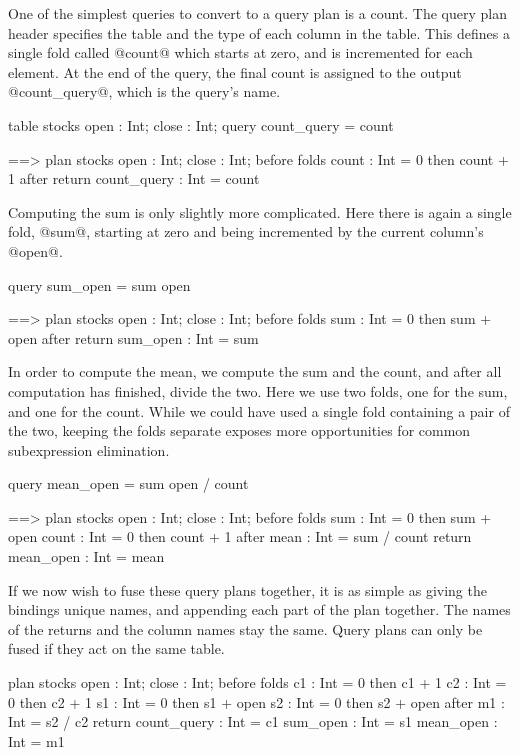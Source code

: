 One of the simplest queries to convert to a query plan is a count.
The query plan header specifies the table and the type of each column in the table.
This defines a single fold called @count@ which starts at zero, and is incremented for each element.
At the end of the query, the final count is assigned to the output @count_query@, which is the query's name.
\begin{code}
    table stocks { open : Int; close : Int; }
    query count_query = count

==> plan stocks { open : Int; close : Int; }
    before { }
    folds  { count : Int = 0 then count + 1 }
    after  { }
    return { count_query : Int = count }
\end{code}

Computing the sum is only slightly more complicated.
Here there is again a single fold, @sum@, starting at zero and being incremented by the current column's @open@.
\begin{code}
    query sum_open = sum open

==> plan stocks { open : Int; close : Int; }
    before { }
    folds  { sum : Int = 0 then sum + open }
    after  { }
    return { sum_open : Int = sum }
\end{code}

In order to compute the mean, we compute the sum and the count, and after all computation has finished, divide the two.
Here we use two folds, one for the sum, and one for the count.
While we could have used a single fold containing a pair of the two, keeping the folds separate exposes more opportunities for common subexpression elimination.
\begin{code}
    query mean_open = sum open / count

==> plan stocks { open : Int; close : Int; }
    before { }
    folds  { sum       : Int = 0 then sum + open 
             count     : Int = 0 then count + 1 }
    after  { mean      : Int = sum / count }
    return { mean_open : Int = mean }
\end{code}

If we now wish to fuse these query plans together, it is as simple as giving the bindings unique names, and appending each part of the plan together.
The names of the returns and the column names stay the same.
Query plans can only be fused if they act on the same table.
\begin{code}
    plan stocks { open : Int; close : Int; }
    before { }
    folds  { c1 : Int = 0 then c1 + 1
             c2 : Int = 0 then c2 + 1
             s1 : Int = 0 then s1 + open 
             s2 : Int = 0 then s2 + open }
    after  { m1 : Int = s2 / c2 }
    return { count_query : Int = c1
             sum_open    : Int = s1
             mean_open   : Int = m1 }
\end{code}

